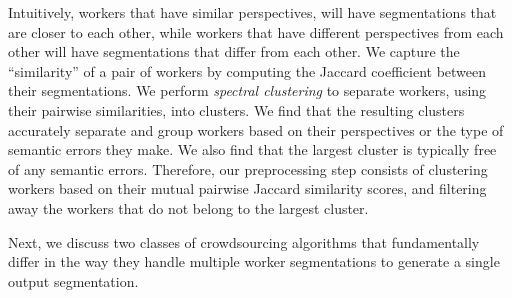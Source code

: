 Intuitively, workers that have similar perspectives, will have segmentations that are closer to each other, while workers that have different perspectives from each other will have segmentations that differ from each other. We capture the ``similarity'' of a pair of workers by computing the Jaccard coefficient between their segmentations. We perform {\em spectral clustering} to separate workers, using their pairwise similarities, into clusters. We find that the resulting clusters accurately separate and group workers based on their perspectives or the type of semantic errors they make. We also find that the largest cluster is typically free of any semantic errors. Therefore, our preprocessing step consists of clustering workers based on their mutual pairwise Jaccard similarity scores, and filtering away the workers that do not belong to the largest cluster. %

Next, we discuss two classes of crowdsourcing algorithms that fundamentally differ in the way they handle multiple worker segmentations to generate a single output segmentation.


